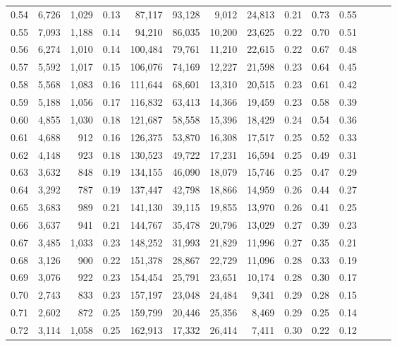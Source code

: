 \begin{tabular}{rrrrrrrrrrrrrr}
0.54 &  6,726 &  1,029 &  0.13 &   87,117 &   93,128 &   9,012 &  24,813 &  0.21 &  0.73 &      0.55 \\
0.55 &  7,093 &  1,188 &  0.14 &   94,210 &   86,035 &  10,200 &  23,625 &  0.22 &  0.70 &      0.51 \\
0.56 &  6,274 &  1,010 &  0.14 &  100,484 &   79,761 &  11,210 &  22,615 &  0.22 &  0.67 &      0.48 \\
0.57 &  5,592 &  1,017 &  0.15 &  106,076 &   74,169 &  12,227 &  21,598 &  0.23 &  0.64 &      0.45 \\
0.58 &  5,568 &  1,083 &  0.16 &  111,644 &   68,601 &  13,310 &  20,515 &  0.23 &  0.61 &      0.42 \\
0.59 &  5,188 &  1,056 &  0.17 &  116,832 &   63,413 &  14,366 &  19,459 &  0.23 &  0.58 &      0.39 \\
0.60 &  4,855 &  1,030 &  0.18 &  121,687 &   58,558 &  15,396 &  18,429 &  0.24 &  0.54 &      0.36 \\
0.61 &  4,688 &    912 &  0.16 &  126,375 &   53,870 &  16,308 &  17,517 &  0.25 &  0.52 &      0.33 \\
0.62 &  4,148 &    923 &  0.18 &  130,523 &   49,722 &  17,231 &  16,594 &  0.25 &  0.49 &      0.31 \\
0.63 &  3,632 &    848 &  0.19 &  134,155 &   46,090 &  18,079 &  15,746 &  0.25 &  0.47 &      0.29 \\
0.64 &  3,292 &    787 &  0.19 &  137,447 &   42,798 &  18,866 &  14,959 &  0.26 &  0.44 &      0.27 \\
0.65 &  3,683 &    989 &  0.21 &  141,130 &   39,115 &  19,855 &  13,970 &  0.26 &  0.41 &      0.25 \\
0.66 &  3,637 &    941 &  0.21 &  144,767 &   35,478 &  20,796 &  13,029 &  0.27 &  0.39 &      0.23 \\
0.67 &  3,485 &  1,033 &  0.23 &  148,252 &   31,993 &  21,829 &  11,996 &  0.27 &  0.35 &      0.21 \\
0.68 &  3,126 &    900 &  0.22 &  151,378 &   28,867 &  22,729 &  11,096 &  0.28 &  0.33 &      0.19 \\
0.69 &  3,076 &    922 &  0.23 &  154,454 &   25,791 &  23,651 &  10,174 &  0.28 &  0.30 &      0.17 \\
0.70 &  2,743 &    833 &  0.23 &  157,197 &   23,048 &  24,484 &   9,341 &  0.29 &  0.28 &      0.15 \\
0.71 &  2,602 &    872 &  0.25 &  159,799 &   20,446 &  25,356 &   8,469 &  0.29 &  0.25 &      0.14 \\
0.72 &  3,114 &  1,058 &  0.25 &  162,913 &   17,332 &  26,414 &   7,411 &  0.30 &  0.22 &      0.12 \\

\end{tabular}
